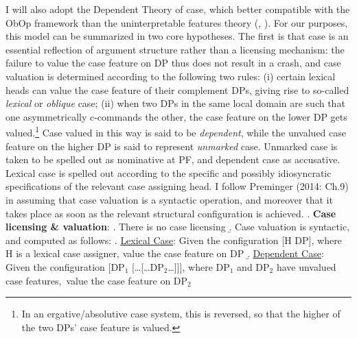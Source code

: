 \documentclass[11pt, letterpaper]{paper_nick}
\begin{document}
I will also adopt the Dependent Theory of case, which better compatible with the ObOp framework than the uninterpretable features theory (\citealt{chomsky00}, \citeyear{chomsky01}). 
For our purposes, this model can be summarized in two core hypotheses. The first is that case is an essential reflection of argument structure rather than a licensing mechanism: the failure to value the case feature on DP thus does not result in a crash, and case valuation is determined according to the following two rules: (i) certain lexical heads can value the case feature of their complement DPs, giving rise to so-called \emph{lexical} or \emph{oblique} case; (ii) when two DPs in the same local domain are such that one asymmetrically c-commands the other, the case feature on the lower DP gets valued.\footnote{In an ergative/absolutive case system, this is reversed, so that the higher of the two DPs' case feature is valued.} 
Case valued in this way is said to be \emph{dependent}, while the unvalued case feature on the higher DP is said to represent \emph{unmarked} case. Unmarked case is taken to be spelled out as nominative at PF, and dependent case as accusative. Lexical case is spelled out according to the specific and possibly idiosyncratic specifications of the relevant case assigning head. I follow Preminger (2014: Ch.9) in assuming that case valuation is a syntactic operation, and moreover that it takes place as soon as the relevant structural configuration is achieved. 
\ex. \textbf{Case licensing \& valuation}:
\a. There is no case licensing 
\b. Case valuation is syntactic, and computed as follows:
\a. \underline{Lexical Case}: Given the configuration [H DP], where H is a lexical case assigner, value the case feature on DP
\b. \underline{Dependent Case}: Given the configuration [DP$_1$ [\ldots[\ldots DP$_2$\ldots]]], where DP$_1$ and DP$_2$ have unvalued case features,\footnotemark\ value the case feature on DP$_2$
\end{document}
